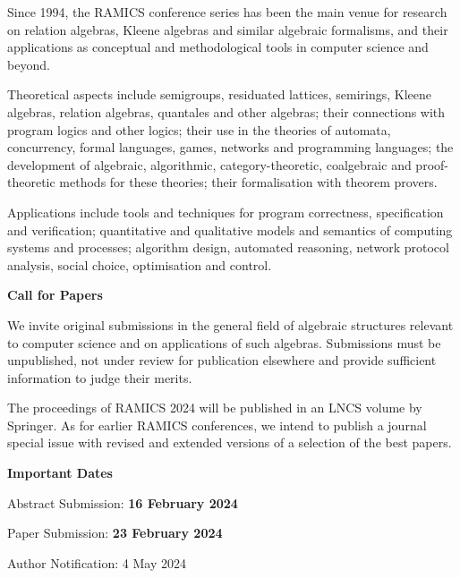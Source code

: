 \documentclass[a3paper, 12pt]{article}
\newcommand*\nfont{\fontsize{16}{19}\selectfont}
\begin{document}
\begin{minipage}[t]{.473\linewidth}
  \nfont%
  Since 1994, the RAMICS conference series has been the main venue for
  research on relation algebras, Kleene algebras and similar algebraic
  formalisms, and their applications as conceptual and methodological
  tools in computer science and beyond.

  \medskip

  Theoretical aspects include semigroups, residuated lattices,
  semirings, Kleene algebras, relation algebras, quantales and other
  algebras; their connections with program logics and other logics;
  their use in the theories of automata, concurrency, formal
  languages, games, networks and programming languages; the
  development of algebraic, algorithmic, category-theoretic,
  coalgebraic and proof-theoretic methods for these theories; their
  formalisation with theorem provers.

  \medskip

  Applications include tools and techniques for program correctness,
  specification and verification; quantitative and qualitative models
  and semantics of computing systems and processes; algorithm design,
  automated reasoning, network protocol analysis, social choice,
  optimisation and control.

  \bigskip

  {\Large \bf Call for Papers}

  \smallskip

  We invite original submissions in the general field of algebraic
  structures relevant to computer science and on applications of such
  algebras.  Submissions must be unpublished, not under review for
  publication elsewhere and provide sufficient information to judge
  their merits.

  The proceedings of RAMICS 2024 will be published in an LNCS volume
  by Springer.  As for earlier RAMICS conferences, we intend to
  publish a journal special issue with revised and extended versions
  of a selection of the best papers.
  
  \bigskip
  
  {\Large \bf Important Dates}

  \smallskip

  Abstract Submission: \textbf{16 February 2024}
  
  Paper Submission: \textbf{23 February 2024}
  
  Author Notification: 4 May 2024

\end{minipage}
\end{document}
